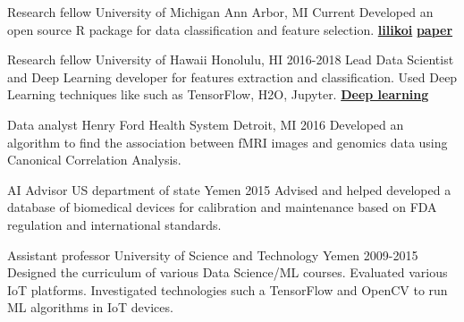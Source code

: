 \begin{cventries}

  \cventry
    {Research fellow}
    {University of Michigan}
    {Ann Arbor, MI}
    {Current}
    {
 Developed an open source R package for data classification and feature selection. \href{https://github.com/FADHLyemen/lilikoi_summary}{\textbf{lilikoi}}
 \href{https://academic.oup.com/gigascience/article/7/12/giy136/5237705}{\textbf{paper}}
    }

  \cventry
    {Research fellow}
    {University of Hawaii}
    {Honolulu, HI}
    {2016-2018}
    {
     Lead Data Scientist and Deep Learning developer for features extraction and classification. Used
    Deep Learning techniques like such as TensorFlow, H2O, Jupyter.
    \href{ https://www.ncbi.nlm.nih.gov/pubmed/29110491}{\textbf{Deep learning}}
    }

  \cventry
    {Data analyst}
    {Henry Ford Health System}
    {Detroit, MI}
    {2016}
    {
      Developed an algorithm to find the association between fMRI images and genomics data using Canonical Correlation Analysis. 
    }

  \cventry
    {AI Advisor}
    {US department of state}
    {Yemen}
    {2015}
    {
    Advised and helped developed a database of biomedical devices for calibration and maintenance based on FDA regulation and international standards.
    }

  \cventry
    {Assistant professor}
    {University of Science and Technology}
    {Yemen}
    {2009-2015}
    {
    Designed the curriculum of various
    Data Science/ML courses. Evaluated various IoT platforms. Investigated
    technologies such a TensorFlow and OpenCV to run ML algorithms in IoT
    devices.
    }


\end{cventries}


